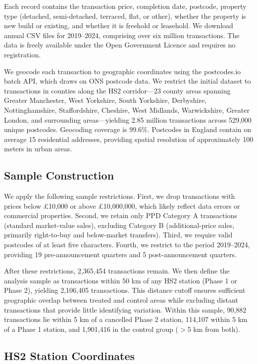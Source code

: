 \documentclass[12pt]{article}
\begin{document}
Each record contains the transaction price, completion date, postcode, property type (detached, semi-detached, terraced, flat, or other), whether the property is new build or existing, and whether it is freehold or leasehold. We download annual CSV files for 2019--2024, comprising over six million transactions. The data is freely available under the Open Government Licence and requires no registration.

We geocode each transaction to geographic coordinates using the postcodes.io batch API, which draws on ONS postcode data. We restrict the initial dataset to transactions in counties along the HS2 corridor---23 county areas spanning Greater Manchester, West Yorkshire, South Yorkshire, Derbyshire, Nottinghamshire, Staffordshire, Cheshire, West Midlands, Warwickshire, Greater London, and surrounding areas---yielding 2.85 million transactions across 529,000 unique postcodes. Geocoding coverage is 99.6\%. Postcodes in England contain on average 15 residential addresses, providing spatial resolution of approximately 100 meters in urban areas.

\subsection{Sample Construction}

We apply the following sample restrictions. First, we drop transactions with prices below \pounds 10,000 or above \pounds 10,000,000, which likely reflect data errors or commercial properties. Second, we retain only PPD Category A transactions (standard market-value sales), excluding Category B (additional-price sales, primarily right-to-buy and below-market transfers). Third, we require valid postcodes of at least five characters. Fourth, we restrict to the period 2019--2024, providing 19 pre-announcement quarters and 5 post-announcement quarters.

After these restrictions, 2,365,454 transactions remain. We then define the analysis sample as transactions within 50 km of any HS2 station (Phase 1 or Phase 2), yielding 2,106,405 transactions. This distance cutoff ensures sufficient geographic overlap between treated and control areas while excluding distant transactions that provide little identifying variation. Within this sample, 90,882 transactions lie within 5 km of a cancelled Phase 2 station, 114,107 within 5 km of a Phase 1 station, and 1,901,416 in the control group ($>$5 km from both).

\subsection{HS2 Station Coordinates}
\end{document}
